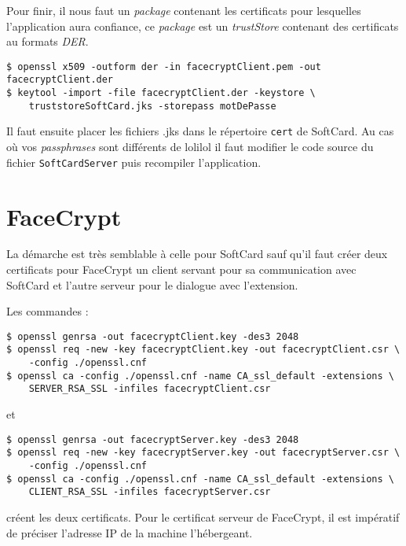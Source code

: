 \documentclass[a4paper,10pt]{article}
\begin{document}
Pour finir, il nous faut un \emph{package} contenant les certificats pour 
lesquelles l'application aura confiance, ce \emph{package} est un 
\emph{trustStore}
contenant des certificats au formats \emph{DER}.
\begin{verbatim}
$ openssl x509 -outform der -in facecryptClient.pem -out facecryptClient.der
$ keytool -import -file facecryptClient.der -keystore \ 
    truststoreSoftCard.jks -storepass motDePasse
\end{verbatim}

Il faut ensuite placer les fichiers .jks dans le répertoire \texttt{cert}
de SoftCard. Au cas où vos \emph{passphrases} sont différents de 
\og lolilol \fg{} il faut modifier le code source du fichier 
\texttt{SoftCardServer} puis recompiler l'application.

\section{FaceCrypt}
La démarche est très semblable à celle pour SoftCard sauf qu'il faut 
créer deux certificats pour FaceCrypt un client servant pour sa communication
avec SoftCard et l'autre serveur pour le dialogue avec l'extension.

Les commandes : 
\begin{verbatim}
$ openssl genrsa -out facecryptClient.key -des3 2048
$ openssl req -new -key facecryptClient.key -out facecryptClient.csr \
    -config ./openssl.cnf
$ openssl ca -config ./openssl.cnf -name CA_ssl_default -extensions \
    SERVER_RSA_SSL -infiles facecryptClient.csr
\end{verbatim}
et 
\begin{verbatim}
$ openssl genrsa -out facecryptServer.key -des3 2048
$ openssl req -new -key facecryptServer.key -out facecryptServer.csr \
    -config ./openssl.cnf
$ openssl ca -config ./openssl.cnf -name CA_ssl_default -extensions \
    CLIENT_RSA_SSL -infiles facecryptServer.csr
\end{verbatim}
créent les deux certificats. Pour le certificat serveur de FaceCrypt, il
est impératif de préciser l'adresse IP de la machine l'hébergeant.
\end{document}
